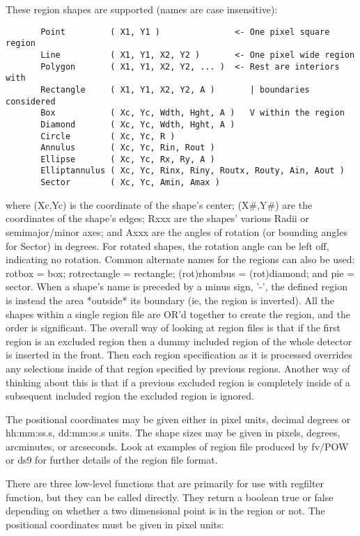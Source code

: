 \documentclass[11pt]{book}
\begin{document}
    These region shapes are supported (names are case insensitive):

\begin{verbatim}
       Point         ( X1, Y1 )               <- One pixel square region
       Line          ( X1, Y1, X2, Y2 )       <- One pixel wide region
       Polygon       ( X1, Y1, X2, Y2, ... )  <- Rest are interiors with
       Rectangle     ( X1, Y1, X2, Y2, A )       | boundaries considered
       Box           ( Xc, Yc, Wdth, Hght, A )   V within the region
       Diamond       ( Xc, Yc, Wdth, Hght, A )
       Circle        ( Xc, Yc, R )
       Annulus       ( Xc, Yc, Rin, Rout )
       Ellipse       ( Xc, Yc, Rx, Ry, A )
       Elliptannulus ( Xc, Yc, Rinx, Riny, Routx, Routy, Ain, Aout )
       Sector        ( Xc, Yc, Amin, Amax )
\end{verbatim}
    where (Xc,Yc) is  the coordinate of  the shape's center; (X\#,Y\#) are
    the coordinates  of the shape's edges;  Rxxx are the shapes' various
    Radii or semimajor/minor  axes; and Axxx  are the angles of rotation
    (or bounding angles for Sector) in degrees.  For rotated shapes, the
    rotation angle  can  be left  off, indicating  no rotation.   Common
    alternate  names for the regions  can also be  used: rotbox = box;
    rotrectangle = rectangle;  (rot)rhombus = (rot)diamond;  and pie
    = sector.  When a  shape's name is  preceded by a minus sign, '-',
    the defined region  is instead the area  *outside* its boundary (ie,
    the region is inverted).  All the shapes within a single region
    file are OR'd together to create the region, and the order is
    significant. The overall way of looking at region files is that if
    the first region is an excluded region then a dummy included region
    of the whole detector is inserted in the front. Then each region
    specification as it is processed overrides any selections inside of
    that region specified by previous regions. Another way of thinking
    about this is that if a previous excluded region is completely
    inside of a subsequent included region the excluded region is
    ignored.

    The positional coordinates may be given either in pixel units,
    decimal degrees or hh:mm:ss.s, dd:mm:ss.s units.  The shape sizes
    may be given in pixels, degrees, arcminutes, or arcseconds.  Look
    at examples of region file produced by fv/POW or ds9 for further
    details of the region file format.

    There are three low-level  functions that are primarily for use with
    regfilter function, but they  can  be  called  directly.  They
    return  a  boolean true   or  false  depending   on  whether a   two
    dimensional point is in the region or not.  The positional coordinates
    must be given in pixel units:
\end{document}
